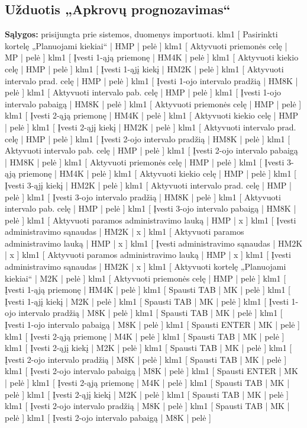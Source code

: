 \subsection{Užduotis „Apkrovų prognozavimas“}
\textbf{Sąlygos:} prisijungta prie sistemos, duomenys importuoti.
\klm
{
  klm1 [ Pasirinkti kortelę „Planuojami kiekiai“ | HMP | pelė ]  
  klm1 [ Aktyvuoti priemonės celę | MP | pelė ]  
  klm1 [ Įvesti 1-ąją priemonę | HM4K | pelė ]
  klm1 [ Aktyvuoti kiekio celę | HMP | pelė ] 
  klm1 [ Įvesti 1-ąjį kiekį | HM2K | pelė ] 
  klm1 [ Aktyvuoti intervalo prad. celę | HMP | pelė ] 
  klm1 [ Įvesti 1-ojo intervalo pradžią | HM8K | pelė ] 
  klm1 [ Aktyvuoti intervalo pab. celę | HMP | pelė ] 
  klm1 [ Įvesti 1-ojo intervalo pabaigą | HM8K | pelė ] 
  klm1 [ Aktyvuoti priemonės celę | HMP | pelė ]  
  klm1 [ Įvesti 2-ąją priemonę | HM4K | pelė ]
  klm1 [ Aktyvuoti kiekio celę | HMP | pelė ] 
  klm1 [ Įvesti 2-ąjį kiekį | HM2K | pelė ] 
  klm1 [ Aktyvuoti intervalo prad. celę | HMP | pelė ] 
  klm1 [ Įvesti 2-ojo intervalo pradžią | HM8K | pelė ] 
  klm1 [ Aktyvuoti intervalo pab. celę | HMP | pelė ] 
  klm1 [ Įvesti 2-ojo intervalo pabaigą | HM8K | pelė ] 
  klm1 [ Aktyvuoti priemonės celę | HMP | pelė ]  
  klm1 [ Įvesti 3-ąją priemonę | HM4K | pelė ]
  klm1 [ Aktyvuoti kiekio celę | HMP | pelė ] 
  klm1 [ Įvesti 3-ąjį kiekį | HM2K | pelė ] 
  klm1 [ Aktyvuoti intervalo prad. celę | HMP | pelė ] 
  klm1 [ Įvesti 3-ojo intervalo pradžią | HM8K | pelė ] 
  klm1 [ Aktyvuoti intervalo pab. celę | HMP | pelė ] 
  klm1 [ Įvesti 3-ojo intervalo pabaigą | HM8K | pelė ] 
  klm1 [ Aktyvuoti paramos administravimo lauką | HMP | x ]
  klm1 [ Įvesti administravimo sąnaudas | HM2K | x ]
  klm1 [ Aktyvuoti paramos administravimo lauką | HMP | x ]
  klm1 [ Įvesti administravimo sąnaudas | HM2K | x ]
  klm1 [ Aktyvuoti paramos administravimo lauką | HMP | x ]
  klm1 [ Įvesti administravimo sąnaudas | HM2K | x ]
}
{
  klm1 [ Aktyvuoti kortelę „Planuojami kiekiai“ | M2K | pelė ]  
  klm1 [ Aktyvuoti priemonės celę | HMP | pelė ]  
  klm1 [ Įvesti 1-ąją priemonę | HM4K | pelė ]
  klm1 [ Spausti TAB | MK | pelė ] 
  klm1 [ Įvesti 1-ąjį kiekį | M2K | pelė ] 
  klm1 [ Spausti TAB | MK | pelė ] 
  klm1 [ Įvesti 1-ojo intervalo pradžią | M8K | pelė ] 
  klm1 [ Spausti TAB | MK | pelė ] 
  klm1 [ Įvesti 1-ojo intervalo pabaigą | M8K | pelė ] 
  klm1 [ Spausti ENTER | MK | pelė ]  
  klm1 [ Įvesti 2-ąją priemonę | M4K | pelė ]
  klm1 [ Spausti TAB | MK | pelė ] 
  klm1 [ Įvesti 2-ąjį kiekį | M2K | pelė ] 
  klm1 [ Spausti TAB | MK | pelė ] 
  klm1 [ Įvesti 2-ojo intervalo pradžią | M8K | pelė ] 
  klm1 [ Spausti TAB | MK | pelė ] 
  klm1 [ Įvesti 2-ojo intervalo pabaigą | M8K | pelė ] 
  klm1 [ Spausti ENTER | MK | pelė ]  
  klm1 [ Įvesti 2-ąją priemonę | M4K | pelė ]
  klm1 [ Spausti TAB | MK | pelė ] 
  klm1 [ Įvesti 2-ąjį kiekį | M2K | pelė ] 
  klm1 [ Spausti TAB | MK | pelė ] 
  klm1 [ Įvesti 2-ojo intervalo pradžią | M8K | pelė ] 
  klm1 [ Spausti TAB | MK | pelė ] 
  klm1 [ Įvesti 2-ojo intervalo pabaigą | M8K | pelė ] 
}

